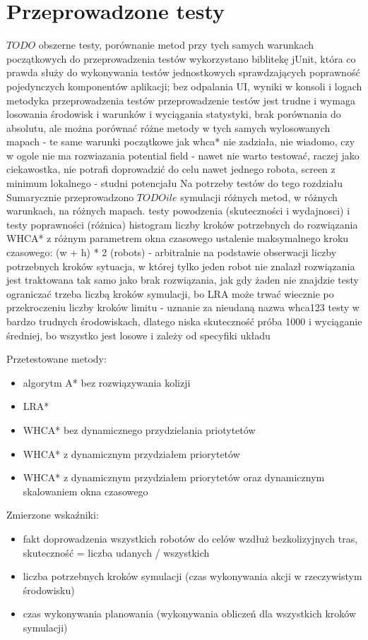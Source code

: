 \chapter{Przeprowadzone testy}
\label{ch:tests}

$TODO$
obszerne testy, porównanie metod przy tych samych warunkach początkowych
do przeprowadzenia testów wykorzystano biblitekę jUnit, która co prawda służy do wykonywania testów jednostkowych sprawdzających poprawność pojedynczych komponentów aplikacji; bez odpalania UI, wyniki w konsoli i logach
metodyka przeprowadzenia testów
przeprowadzenie testów jest trudne i wymaga losowania środowisk i warunków i wyciągania statystyki, brak porównania do absolutu, ale można porównać różne metody w tych samych wylosowanych mapach - te same warunki początkowe
jak whca* nie zadziała, nie wiadomo, czy w ogole nie ma rozwiazania
potential field - nawet nie warto testować, raczej jako ciekawostka, nie potrafi doprowadzić do celu nawet jednego robota, screen z minimum lokalnego - studni potencjału
Na potrzeby testów do tego rozdziału Sumarycznie przeprowadzono $TODO ile$ symulacji różnych metod, w różnych warunkach, na różnych mapach.
testy powodzenia (skuteczności i wydajnosci) i testy poprawności (różnica)
histogram liczby kroków potrzebnych do rozwiązania
WHCA* z różnym parametrem okna czasowego
ustalenie maksymalnego kroku czasowego: (w + h) * 2 (robots) - arbitralnie na podstawie obserwacji liczby potrzebnych kroków
sytuacja, w której tylko jeden robot nie znalazł rozwiązania jest traktowana tak samo jako brak rozwiązania, jak gdy żaden nie znajdzie
testy ograniczać trzeba liczbą kroków symulacji, bo LRA może trwać wiecznie
po przekroczeniu liczby kroków limitu - uznanie za nieudaną
nazwa whca123
testy w bardzo trudnych środowiskach, dlatego niska skuteczność
próba 1000 i wyciąganie średniej, bo wszystko jest losowe i zależy od specyfiki układu

Przetestowane metody:
\begin{itemize}
	\item algorytm A* bez rozwiązywania kolizji
	\item LRA*
	\item WHCA* bez dynamicznego przydzielania priotytetów
	\item WHCA* z dynamicznym przydziałem priorytetów
	\item WHCA* z dynamicznym przydziałem priorytetów oraz dynamicznym skalowaniem okna czasowego
\end{itemize}

Zmierzone wskaźniki:
\begin{itemize}
	\item fakt doprowadzenia wszystkich robotów do celów wzdłuż bezkolizyjnych tras, skuteczność = liczba udanych / wszystkich
	\item liczba potrzebnych kroków symulacji (czas wykonywania akcji w rzeczywistym środowisku)
	\item czas wykonywania planowania (wykonywania obliczeń dla wszystkich kroków symulacji)
\end{itemize}

